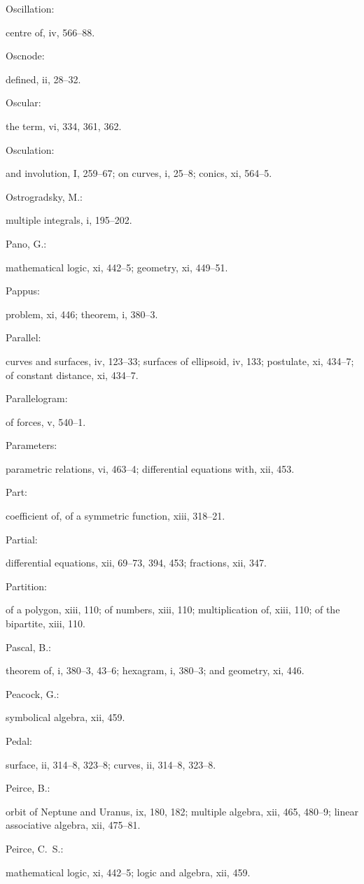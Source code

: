 \documentclass[11pt,a4paper]{book}
\providecommand{\V}[1]{#1}
\providecommand{\IndexEntry}[2]{#1\dotfill #2\par}
\begin{document}
\IndexEntry{Oscillation}: centre of, \V{iv}, 566--88.

\IndexEntry{Oscnode}: defined, \V{ii}, 28--32.

\IndexEntry{Oscular}: the term, \V{vi}, 334, 361, 362.

\IndexEntry{Osculation}: and involution, \V{I}, 259--67; on curves, \V{i}, 25--8; conics, \V{xi}, 564--5.

\IndexEntry{Ostrogradsky, M.}: multiple integrals, \V{i}, 195--202.

\IndexEntry{Pano, G.}: mathematical logic, \V{xi}, 442--5; geometry, \V{xi}, 449--51.

\IndexEntry{Pappus}: problem, \V{xi}, 446; theorem, \V{i}, 380--3.

\IndexEntry{Parallel}: curves and surfaces, \V{iv}, 123--33; surfaces of ellipsoid, \V{iv}, 133; postulate, \V{xi}, 434--7; of constant distance, \V{xi}, 434--7.

\IndexEntry{Parallelogram}: of forces, \V{v}, 540--1.

\IndexEntry{Parameters}: parametric relations, \V{vi}, 463--4; differential equations with, \V{xii}, 453.

\IndexEntry{Part}: coefficient of, of a symmetric function, \V{xiii}, 318--21.

\IndexEntry{Partial}: differential equations, \V{xii}, 69--73, 394, 453; fractions, \V{xii}, 347.

\IndexEntry{Partition}: of a polygon, \V{xiii}, 110; of numbers, \V{xiii}, 110; multiplication of, \V{xiii}, 110; of the bipartite, \V{xiii}, 110.

\IndexEntry{Pascal, B.}: theorem of, \V{i}, 380--3, 43--6; hexagram, \V{i}, 380--3; and geometry, \V{xi}, 446.

\IndexEntry{Peacock, G.}: symbolical algebra, \V{xii}, 459.

\IndexEntry{Pedal}: surface, \V{ii}, 314--8, 323--8; curves, \V{ii}, 314--8, 323--8.

\newpage

\setcounter{page}{116}

\IndexEntry{Peirce, B.}: orbit of Neptune and Uranus, \V{ix}, 180, 182; multiple algebra, \V{xii}, 465, 480--9; linear associative algebra, \V{xii}, 475--81.

\IndexEntry{Peirce, C.\ S.}: mathematical logic, \V{xi}, 442--5; logic and algebra, \V{xii}, 459.
\end{document}
